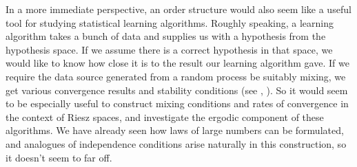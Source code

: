 \documentclass[letterpaper,10pt,oneside,onecolumn,reqno]{amsart}
\theoremstyle{definition}
\begin{document}
In a more immediate perspective, an order structure would also seem
like a useful tool for studying statistical learning
algorithms. Roughly speaking, a learning algorithm takes a bunch of
data and supplies us with a hypothesis from the hypothesis space. If
we assume there is a correct hypothesis in that space, we would like
to know how close it is to the result our learning algorithm gave. If
we require the data source generated from a random process be suitably
mixing, we get various convergence results and stability conditions
(see \cite{Jiang:2009:UDG:1577069.1577105},
\cite{2007arXiv0707.0322S}). So it would seem to be especially useful
to construct mixing conditions and rates of convergence in the context
of Riesz spaces, and investigate the ergodic component of these
algorithms. We have already seen how laws of large numbers can be
formulated, and analogues of independence conditions arise naturally
in this construction, so it doesn't seem to far off.


\printindex
\end{document}
